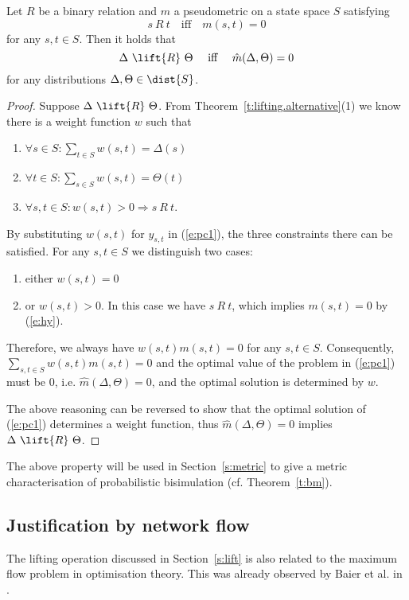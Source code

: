 \documentclass{article}
\begin{document}
\begin{theorem}\label{t:metric.relation}
Let $R$ be a binary relation and $m$ a pseudometric on a state space
$S$ satisfying \begin{equation}\label{e:hy} s\ R\ t
\quad\mbox{iff}\quad m(s,t)=0 \end{equation} for any $s,t\in S$.
Then it holds that \[\Delta\ \lift{R}\ \Theta \quad\mbox{ iff }\quad
\hat{m}(\Delta,\Theta)=0\] for any distributions
$\Delta,\Theta\in\dist{S}$.
\end{theorem}
\begin{proof}
Suppose $\Delta\ \lift{R}\ \Theta$. From
Theorem~\ref{t:lifting.alternative}(1) we know there is a weight
function $w$ such that
  \begin{enumerate}
  \item $\forall s\in S: \sum_{t\in S}w(s,t) = \Delta(s)$
  \item $\forall t\in S: \sum_{s\in S}w(s,t) = \Theta(t)$
  \item $\forall s,t\in S: w(s,t) > 0 \Rightarrow s\ R\ t$.
  \end{enumerate}
By substituting $w(s,t)$ for $y_{s,t}$ in (\ref{e:pc1}), the three
constraints there can be satisfied. For any $s,t\in S$ we
distinguish two cases:
\begin{enumerate}
\item either $w(s,t)=0$
\item or $w(s,t)>0$. In this case we have $s\ R\ t$, which implies
$m(s,t)=0$ by (\ref{e:hy}).
\end{enumerate}
Therefore, we always have $w(s,t)m(s,t)=0$ for any $s,t\in S$.
Consequently, $\sum_{s,t\in S}w(s,t)m(s,t)=0$ and the optimal value
of the problem in (\ref{e:pc1}) must be $0$, i.e.
$\hat{m}(\Delta,\Theta)=0$, and the optimal solution is determined
by $w$.

The above reasoning can be reversed to show that the optimal
solution of (\ref{e:pc1}) determines a weight function, thus
$\hat{m}(\Delta,\Theta)=0$ implies $\Delta\ \lift{R}\ \Theta$.
\end{proof}

The above property will be used in Section~\ref{s:metric} to give a
metric characterisation of probabilistic bisimulation (cf.
Theorem~\ref{t:bm}).

\subsection{Justification by network flow}
The lifting operation discussed in Section~\ref{s:lift} is also
related to the maximum flow problem in optimisation theory. This was
already observed by Baier et al. in \cite{BEM00}.
\end{document}
